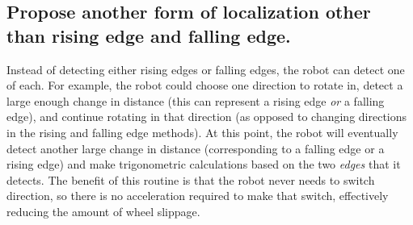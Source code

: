 \documentclass[11pt]{article}
\begin{document}
\subsection{Propose another form of localization other than rising edge and falling edge.}
\par Instead of detecting either rising edges or falling edges, the robot can detect one of each. For
example, the robot could choose one direction to rotate in, detect a large enough change in distance
(this can represent a rising edge \textit{or} a falling edge), and continue rotating in that
direction (as opposed to changing directions in the rising and falling edge methods). At this point,
the robot will eventually detect another large change in distance (corresponding to a falling edge
or a rising edge) and make trigonometric calculations based on the two \textit{edges} that it
detects. The benefit of this routine is that the robot never needs to switch direction, so there is
no acceleration required to make that switch, effectively reducing the amount of wheel slippage.
\end{document}
